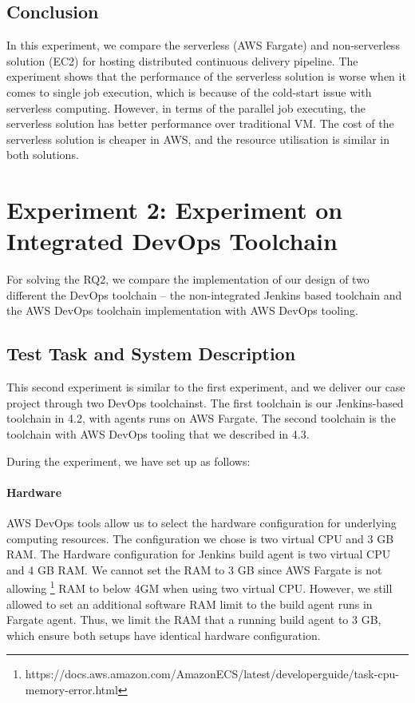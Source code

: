 \subsection{Conclusion}
In this experiment, we compare the serverless (AWS Fargate) and non-serverless solution (EC2) for hosting distributed continuous delivery pipeline. The experiment shows that the performance of the serverless solution is worse when it comes to single job execution, which is because of the cold-start issue with serverless computing. However, in terms of the parallel job executing, the serverless solution has better performance over traditional VM. The cost of the serverless solution is cheaper in AWS, and the resource utilisation is similar in both solutions.
\section{Experiment 2: Experiment on Integrated DevOps Toolchain}
For solving the RQ2, we compare the implementation of our design of two different the DevOps toolchain -- the non-integrated Jenkins based toolchain and the AWS DevOps toolchain implementation with AWS DevOps tooling.
\subsection{Test Task and System Description}
This second experiment is similar to the first experiment, and we deliver our case project through two DevOps toolchainst. The first toolchain is our Jenkins-based toolchain in 4.2, with agents runs on AWS Fargate. The second toolchain is the toolchain with AWS DevOps tooling that we described in 4.3.
\par
During the experiment, we have set up as follows:
\paragraph{Hardware}
AWS DevOps tools allow us to select the hardware configuration for underlying computing resources. The configuration we chose is two virtual CPU and 3 GB RAM.
The Hardware configuration for Jenkins build agent is two virtual CPU and 4 GB RAM. We cannot set the RAM to 3 GB since AWS Fargate is not allowing \footnote{https://docs.aws.amazon.com/AmazonECS/latest/developerguide/task-cpu-memory-error.html} RAM to below 4GM when using two virtual CPU. However, we still allowed to set an additional software RAM limit to the build agent runs in Fargate agent. Thus, we limit the RAM that a running build agent to 3 GB, which ensure both setups have identical hardware configuration.

